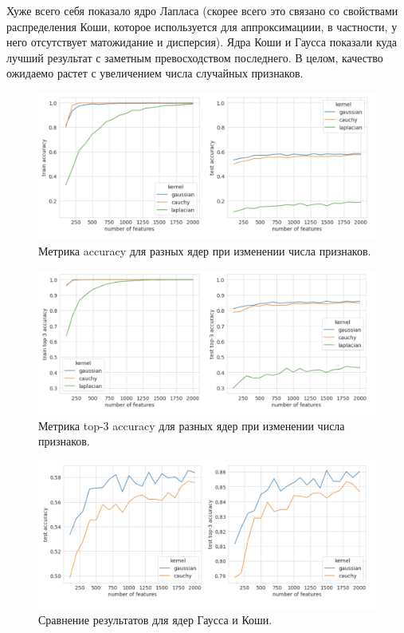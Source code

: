 \documentclass{article}
\begin{document}
Хуже всего себя показало ядро Лапласа (скорее всего это связано со свойствами распределения Коши, которое используется для аппроксимациии, в частности, у него отсутствует матожидание и дисперсия). Ядра Коши и Гаусса показали куда лучший результат с заметным превосходством последнего. В целом, качество ожидаемо растет с увеличением числа случайных признаков.

\begin{figure}[H]
    \centering
    \includegraphics[width=14cm]{images/kernels_top1.png}
    \caption{Метрика accuracy для разных ядер при изменении числа признаков.}
    \label{fig:my_label}
\end{figure}{}

\begin{figure}[H]
    \centering
    \includegraphics[width=14cm]{images/kernels_top3.png}
    \caption{Метрика top-3 accuracy для разных ядер при изменении числа признаков.}
    \label{fig:my_label}
\end{figure}{}

\begin{figure}[H]
    \centering
    \includegraphics[width=14cm]{images/gauss_cauchy.png}
    \caption{Сравнение результатов для ядер Гаусса и Коши.}
    \label{fig:my_label}
\end{figure}{}
\end{document}
